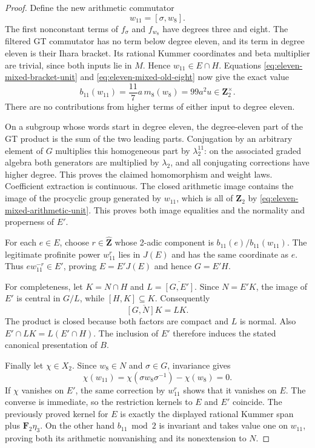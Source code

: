 \begin{proof}
Define the new arithmetic commutator
\[
 w_{11}=[\sigma,w_8].
\]
The first nonconstant terms of $f_\sigma$ and $f_{w_8}$ have
degrees three and eight. The filtered GT commutator has no term
below degree eleven, and its term in degree eleven is their
Ihara bracket. Its rational Kummer coordinates and beta multiplier
are trivial, since both inputs lie in $M$. Hence $w_{11}\in E\cap H$.
Equations \eqref{eq:eleven-mixed-bracket-unit} and
\eqref{eq:eleven-mixed-old-eight} now give the exact value
\begin{equation}\label{eq:eleven-mixed-arithmetic-unit}
 b_{11}(w_{11})
  =\frac{11}{7}a\,m_8(w_8)
  =99a^2u\in\mathbf Z_2^\times.
\end{equation}
There are no contributions from higher terms of either input to
degree eleven.

On a subgroup whose words start in degree eleven, the degree-eleven
part of the GT product is the sum of the two leading parts.
Conjugation by an arbitrary element of $G$ multiplies this
homogeneous part by $\lambda_2^{11}$: on the associated graded
algebra both generators are multiplied by $\lambda_2$, and all
conjugating corrections have higher degree. This proves the
claimed homomorphism and weight laws. Coefficient extraction is
continuous. The closed arithmetic image contains the image of the
procyclic group generated by $w_{11}$, which is all of $\mathbf Z_2$
by \eqref{eq:eleven-mixed-arithmetic-unit}. This proves both image
equalities and the normality and properness of $E'$.

For each $e\in E$, choose $r\in\widehat{\mathbf Z}$ whose
2-adic component is $b_{11}(e)/b_{11}(w_{11})$. The legitimate
profinite power $w_{11}^r$ lies in $J(E)$ and has the same
coordinate as $e$. Thus $e w_{11}^{-r}\in E'$, proving
$E=E'J(E)$ and hence $G=E'H$.

For completeness, let $K=N\cap H$ and
$L=\overline{[G,E']}$. Since $N=E'K$, the image of $E'$ is
central in $G/L$, while $[H,K]\subseteq K$. Consequently
\[
 \overline{[G,N]K}=LK.
\]
The product is closed because both factors are compact and $L$
is normal. Also $E'\cap LK=L(E'\cap H)$. The inclusion of $E'$
therefore induces the stated canonical presentation of $B$.

Finally let $\chi\in X_2$. Since $w_8\in N$ and $\sigma\in G$,
invariance gives
\[
 \chi(w_{11})=\chi(\sigma w_8\sigma^{-1})-\chi(w_8)=0.
\]
If $\chi$ vanishes on $E'$, the same correction by $w_{11}^r$
shows that it vanishes on $E$. The converse is immediate, so the
restriction kernels to $E$ and $E'$ coincide. The previously proved
kernel for $E$ is exactly the displayed rational Kummer span plus
$\mathbf F_2\eta_3$. On the other hand $b_{11}\bmod2$ is invariant
and takes value one on $w_{11}$, proving both its arithmetic
nonvanishing and its nonextension to $N$.
\end{proof}

